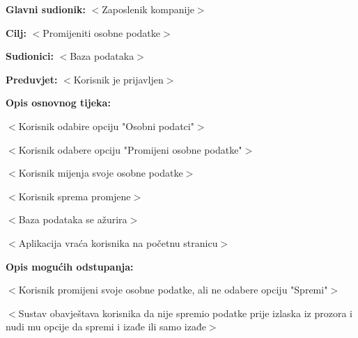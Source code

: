 					\noindent {}
					\begin{packed_item}

						\item \textbf{Glavni sudionik: }$<$Zaposlenik kompanije$>$
						\item  \textbf{Cilj:} $<$Promijeniti osobne podatke$>$
						\item  \textbf{Sudionici:} $<$Baza podataka$>$
						\item  \textbf{Preduvjet:} $<$Korisnik je prijavljen$>$
						\item  \textbf{Opis osnovnog tijeka:}

						\item[] \begin{packed_enum}

							\item $<$Korisnik odabire opciju "Osobni podatci"$>$
							\item $<$Korisnik odabere opciju "Promijeni osobne podatke"$>$
							\item $<$Korisnik mijenja svoje osobne podatke$>$
							\item $<$Korisnik sprema promjene$>$
							\item $<$Baza podataka se ažurira$>$
							\item $<$Aplikacija vraća korisnika na početnu stranicu$>$
						\end{packed_enum}

						\item  \textbf{Opis mogućih odstupanja:}

						\item[] \begin{packed_item}

							\item[3.a] $<$Korisnik promijeni svoje osobne podatke,
							ali ne odabere opciju "Spremi"$>$
							\item[] \begin{packed_enum}

								\item $<$Sustav obavještava korisnika da nije spremio podatke prije izlaska
								iz prozora i nudi mu opcije da spremi i izađe ili samo izađe$>$

							\end{packed_enum}

						\end{packed_item}
					\end{packed_item}

